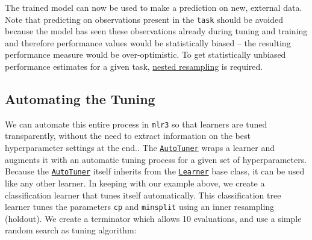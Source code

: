 \documentclass[
]{scrbook}
\newenvironment{Shaded}{\begin{snugshade}}{\end{snugshade}}
\newcommand{\FunctionTok}[1]{\textcolor[rgb]{0.00,0.00,0.00}{#1}}
\newcommand{\NormalTok}[1]{#1}
\newcommand{\OtherTok}[1]{\textcolor[rgb]{0.56,0.35,0.01}{#1}}
\newcommand{\SpecialCharTok}[1]{\textcolor[rgb]{0.00,0.00,0.00}{#1}}
\renewenvironment{Shaded} {\begin{snugshade}\small} {\end{snugshade}}
\begin{document}
\begin{Shaded}
\end{Shaded}

The trained model can now be used to make a prediction on new, external data.
Note that predicting on observations present in the \texttt{task} should be avoided because the model has seen these observations already during tuning and training and therefore performance values would be statistically biased -- the resulting performance measure would be over-optimistic.
To get statistically unbiased performance estimates for a given task, \protect\hyperlink{nested-resampling}{nested resampling} is required.

\hypertarget{autotuner}{%
\subsection{Automating the Tuning}\label{autotuner}}

We can automate this entire process in \texttt{mlr3} so that learners are tuned transparently, without the need to extract information on the best hyperparameter settings at the end..
The \href{https://mlr3tuning.mlr-org.com/reference/AutoTuner.html}{\texttt{AutoTuner}} wraps a learner and augments it with an automatic tuning process for a given set of hyperparameters.
Because the \href{https://mlr3tuning.mlr-org.com/reference/AutoTuner.html}{\texttt{AutoTuner}} itself inherits from the \href{https://mlr3.mlr-org.com/reference/Learner.html}{\texttt{Learner}} base class, it can be used like any other learner.
In keeping with our example above, we create a classification learner that tunes itself automatically.
This classification tree learner tunes the parameters \texttt{cp} and \texttt{minsplit} using an inner resampling (holdout).
We create a terminator which allows 10 evaluations, and use a simple random search as tuning algorithm:
\end{document}
